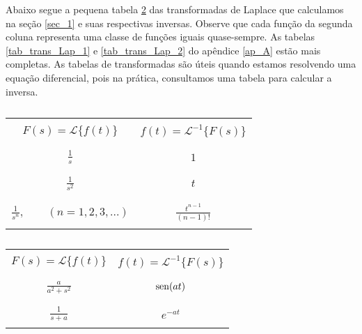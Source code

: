 Abaixo segue a pequena tabela \ref{tab_1} das transformadas de Laplace que calculamos na seção \ref{sec_1} e suas respectivas inversas. Observe que cada função da segunda coluna representa uma classe de funções iguais quase-sempre. As tabelas \ref{tab_trans_Lap_1} e \ref{tab_trans_Lap_2} do apêndice \ref{ap_A} estão mais completas. As tabelas de transformadas são úteis quando estamos resolvendo uma equação diferencial, pois na prática, consultamos uma tabela para calcular a inversa.
\begin{table}
\begin{small}
\begin{center}
\begin{tabular}{|c|c|}
\hline &\\
$\displaystyle F(s)=\mathcal{L }\{f(t)\} $&$\displaystyle  f(t)=\mathcal{L }^{-1}\{F(s)\}$ \\&\\ 
\hline &\\
$\displaystyle \frac{1}{s} $&$\displaystyle  1$ \\ &\\
\hline &\\
$\displaystyle \frac{1}{s^2} $&$\displaystyle  t$ \\ &\\
\hline &\\
$\displaystyle \frac{1}{s^n}, \qquad (n=1,2,3,...) $&$\displaystyle  \frac{t^{n-1}}{(n-1)!}$ \\ &\\
\hline
\end{tabular}
\begin{tabular}{|c|c|}
\hline &\\
$\displaystyle F(s)=\mathcal{L }\{f(t)\} $&$\displaystyle  f(t)=\mathcal{L }^{-1}\{F(s)\}$ \\&\\ 
\hline &\\
$\displaystyle \frac{a}{a^2+s^2} $&$\displaystyle  \operatorname{sen}(at)$ \\ &\\
\hline &\\
$\displaystyle \frac{1}{s+a} $&$\displaystyle  e^{ -at}$ \\ &\\
\hline
\end{tabular}

\caption{\label{tab_1}}
\end{center}
\end{small}
\end{table}

